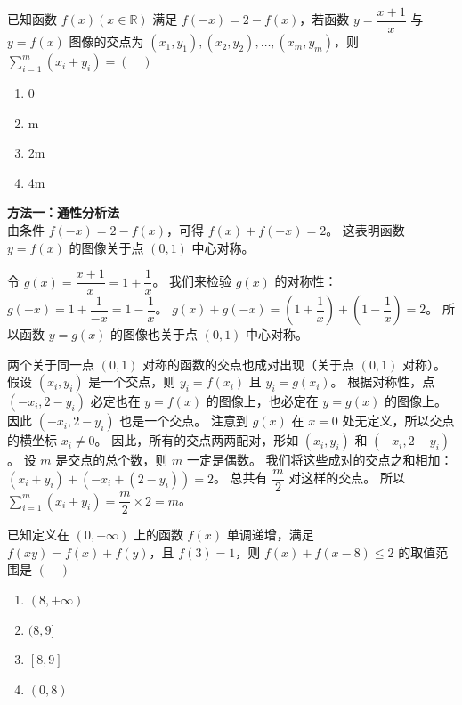 \begin{example}[\ \ 2016 全国II卷]
    已知函数 $f(x) (x \in \mathbb{R})$ 满足 $f(-x) = 2 - f(x)$，若函数 $y = \dfrac{x+1}{x}$ 与 $y=f(x)$ 图像的交点为 $(x_1, y_1), (x_2, y_2), \dots, (x_m, y_m)$，则 $\sum_{i=1}^{m} (x_i + y_i) = (\quad)$
    \begin{enumerate}
        \item[A.] 0
        \item[B.] m
        \item[C.] 2m
        \item[D.] 4m
    \end{enumerate}
\end{example}

\begin{solution}
    \textbf{方法一：通性分析法} \\
    由条件 $f(-x) = 2 - f(x)$，可得 $f(x)+f(-x)=2$。
    这表明函数 $y=f(x)$ 的图像关于点 $(0, 1)$ 中心对称。

    令 $g(x) = \dfrac{x+1}{x} = 1 + \dfrac{1}{x}$。
    我们来检验 $g(x)$ 的对称性：
    $g(-x) = 1 + \dfrac{1}{-x} = 1 - \dfrac{1}{x}$。
    $g(x) + g(-x) = (1 + \dfrac{1}{x}) + (1 - \dfrac{1}{x}) = 2$。
    所以函数 $y=g(x)$ 的图像也关于点 $(0, 1)$ 中心对称。

    两个关于同一点 $(0,1)$ 对称的函数的交点也成对出现（关于点 $(0,1)$ 对称）。
    假设 $(x_i, y_i)$ 是一个交点，则 $y_i = f(x_i)$ 且 $y_i = g(x_i)$。
    根据对称性，点 $(-x_i, 2-y_i)$ 必定也在 $y=f(x)$ 的图像上，也必定在 $y=g(x)$ 的图像上。因此 $(-x_i, 2-y_i)$ 也是一个交点。
    注意到 $g(x)$ 在 $x=0$ 处无定义，所以交点的横坐标 $x_i \neq 0$。
    因此，所有的交点两两配对，形如 $(x_i, y_i)$ 和 $(-x_i, 2-y_i)$。
    设 $m$ 是交点的总个数，则 $m$ 一定是偶数。
    我们将这些成对的交点之和相加：
    $(x_i + y_i) + (-x_i + (2-y_i)) = 2$。
    总共有 $\dfrac{m}{2}$ 对这样的交点。
    所以 $\sum_{i=1}^{m} (x_i + y_i) = \dfrac{m}{2} \times 2 = m$。
\end{solution}

\begin{example}[\ \ 2020 高三模拟]
    已知定义在 $(0, +\infty)$ 上的函数 $f(x)$ 单调递增，满足 $f(xy)=f(x)+f(y)$，且 $f(3)=1$，则 $f(x)+f(x-8) \le 2$ 的取值范围是 $(\quad)$
    \begin{enumerate}
        \item[A.] $(8, +\infty)$
        \item[B.] $(8, 9]$
        \item[C.] $[8, 9]$
        \item[D.] $(0, 8)$
    \end{enumerate}
\end{example}

